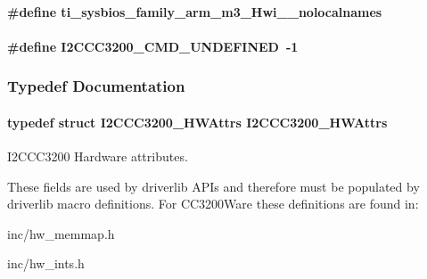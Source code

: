 \paragraph[{ti\-\_\-sysbios\-\_\-family\-\_\-arm\-\_\-m3\-\_\-\-Hwi\-\_\-\-\_\-nolocalnames}]{\setlength{\rightskip}{0pt plus 5cm}\#define ti\-\_\-sysbios\-\_\-family\-\_\-arm\-\_\-m3\-\_\-\-Hwi\-\_\-\-\_\-nolocalnames}\label{_i2_c_c_c3200_8h_aaa17ecf48f5762e2e1bdb0bab8aacf0c}
\paragraph[{I2\-C\-C\-C3200\-\_\-\-C\-M\-D\-\_\-\-U\-N\-D\-E\-F\-I\-N\-E\-D}]{\setlength{\rightskip}{0pt plus 5cm}\#define I2\-C\-C\-C3200\-\_\-\-C\-M\-D\-\_\-\-U\-N\-D\-E\-F\-I\-N\-E\-D~-\/1}\label{_i2_c_c_c3200_8h_a64054521d7711a0efafa007d7bc9e218}


\subsubsection{Typedef Documentation}
\paragraph[{I2\-C\-C\-C3200\-\_\-\-H\-W\-Attrs}]{\setlength{\rightskip}{0pt plus 5cm}typedef struct {\bf I2\-C\-C\-C3200\-\_\-\-H\-W\-Attrs}  {\bf I2\-C\-C\-C3200\-\_\-\-H\-W\-Attrs}}\label{_i2_c_c_c3200_8h_a684a95a71c6d653f099add355c43a1dd}


I2\-C\-C\-C3200 Hardware attributes. 

These fields are used by driverlib A\-P\-Is and therefore must be populated by driverlib macro definitions. For C\-C3200\-Ware these definitions are found in\-:
\begin{DoxyItemize}
\item inc/hw\-\_\-memmap.\-h
\item inc/hw\-\_\-ints.\-h
\end{DoxyItemize}

